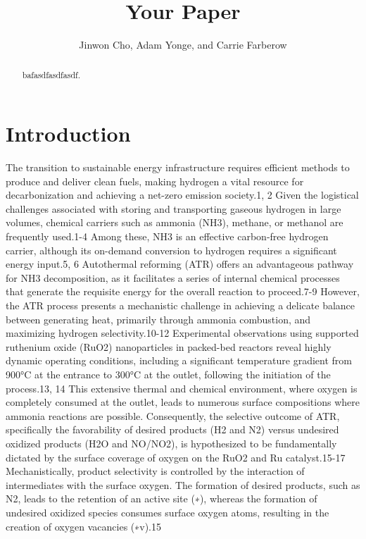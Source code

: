 \documentclass[twocolumn,showpacs,%
  nofootinbib,aps,superscriptaddress,%
  eqsecnum,prd,notitlepage,showkeys,10pt]{revtex4-1}
\begin{document}
\title{Your Paper}
\author{Jinwon Cho, Adam Yonge, and Carrie Farberow}

\begin{abstract}
bafasdfasdfasdf.
\end{abstract}

\maketitle

\section{Introduction}
The transition to sustainable energy infrastructure requires efficient methods to produce and deliver clean fuels, making hydrogen a vital resource for decarbonization and achieving a net-zero emission society.1, 2 Given the logistical challenges associated with storing and transporting gaseous hydrogen in large volumes, chemical carriers such as ammonia (NH3), methane, or methanol are frequently used.1-4 Among these, NH3 is an effective carbon-free hydrogen carrier, although its on-demand conversion to hydrogen requires a significant energy input.5, 6
Autothermal reforming (ATR) offers an advantageous pathway for NH3 decomposition, as it facilitates a series of internal chemical processes that generate the requisite energy for the overall reaction to proceed.7-9 However, the ATR process presents a mechanistic challenge in achieving a delicate balance between generating heat, primarily through ammonia combustion, and maximizing hydrogen selectivity.10-12 Experimental observations using supported ruthenium oxide (RuO2) nanoparticles in packed-bed reactors reveal highly dynamic operating conditions, including a significant temperature gradient from 900°C at the entrance to 300°C at the outlet, following the initiation of the process.13, 14 This extensive thermal and chemical environment, where oxygen is completely consumed at the outlet, leads to numerous surface compositions where ammonia reactions are possible.
Consequently, the selective outcome of ATR, specifically the favorability of desired products (H2 and N2) versus undesired oxidized products (H2O and NO/NO2), is hypothesized to be fundamentally dictated by the surface coverage of oxygen on the RuO2 and Ru catalyst.15-17 Mechanistically, product selectivity is controlled by the interaction of intermediates with the surface oxygen. The formation of desired products, such as N2, leads to the retention of an active site (∗), whereas the formation of undesired oxidized species consumes surface oxygen atoms, resulting in the creation of oxygen vacancies (∗v).15
\end{document}
